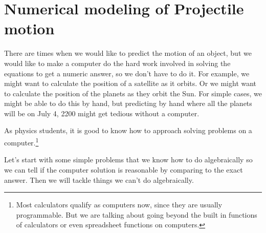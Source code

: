 \documentclass[twoside,11pt,ShortChapTitles]{BYUTextbook}
\begin{document}
\chapter[Numerical modeling I]{Numerical modeling of Projectile motion}

There are times when we would like to predict the motion of an object, but we
would like to make a computer do the hard work involved in solving the
equations to get a numeric answer, so we don't have to do it. For example, we
might want to calculate the position of a satellite as it orbits. Or we might
want to calculate the position of the planets as they orbit the Sun. For
simple cases, we might be able to do this by hand, but predicting by hand
where all the planets will be on July 4, 2200 might get tedious without a computer.

As physics students, it is good to know how to approach solving problems on a
computer.\footnote{Most calculators qualify as computers now, since they are
usually programmable. But we are talking about going beyond the built in
functions of calculators or even spreadsheet functions on computers.}

Let's start with some simple problems that we know how to do algebraically so
we can tell if the computer solution is reasonable by comparing to the exact
answer. Then we will tackle things we can't do algebraically.
\end{document}
